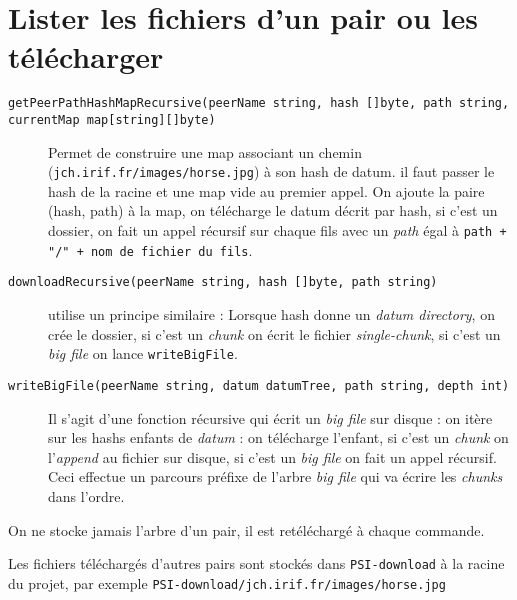 \section{Lister les fichiers d'un pair ou les télécharger}
\begin{description}
    \item [\small\texttt{getPeerPathHashMapRecursive(peerName string, hash []byte, path string, currentMap map[string][]byte)}\normalsize]
        Permet de construire une map associant un chemin (\texttt{jch.irif.fr/images/horse.jpg}) à son hash de datum. il faut passer le hash de la racine et une map vide au premier appel. On ajoute la paire (hash, path) à la map, on télécharge le datum décrit par hash, si c'est un dossier, on fait un appel récursif sur chaque fils avec un \textit{path} égal à \texttt{path + "/" + nom de fichier du fils}.
    \item [\texttt{downloadRecursive(peerName string, hash []byte, path string)}] utilise un principe similaire :
        Lorsque hash donne un \textit{datum directory}, on crée le dossier, si c'est un \textit{chunk} on écrit le fichier \textit{single-chunk}, si c'est un \textit{big file} on lance \texttt{writeBigFile}.
    \item [\texttt{writeBigFile(peerName string, datum datumTree, path string, depth int)}] Il s'agit d'une fonction récursive qui écrit un \textit{big file} sur disque : on itère sur les hashs enfants de \textit{datum} : on télécharge l'enfant, si c'est un \textit{chunk} on l'\textit{append} au fichier sur disque, si c'est un \textit{big file} on fait un appel récursif. Ceci effectue un parcours préfixe de l'arbre \textit{big file} qui va écrire les \textit{chunks} dans l'ordre.

\end{description}


On ne stocke jamais l'arbre d'un pair, il est retéléchargé à chaque commande.

Les fichiers téléchargés d'autres pairs sont stockés dans \texttt{PSI-download} à la racine du projet, par exemple \texttt{PSI-download/jch.irif.fr/images/horse.jpg}

